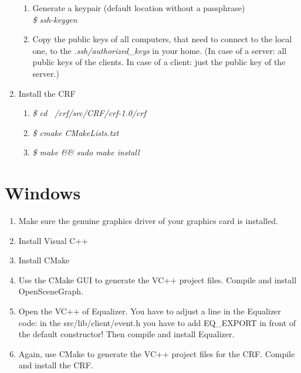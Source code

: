 \begin{enumerate}
		\begin{enumerate}
                        \item Generate a keypair (default location without a passphrase) \\ 
				\textit{\$ ssh-keygen}
                        \item Copy the public keys of all computers, that need to connect to the local one, to the \textit{.ssh/authorized\_keys} in your home. (In case of a server: all public keys of the clients. In case of a client: just the public key of the server.)
                \end{enumerate}
	\item Install the CRF
		\begin{enumerate}
                        \item \textit{\$ cd ~/crf/src/CRF/crf-1.0/crf}
                        \item \textit{\$ cmake CMakeLists.txt}
                        \item \textit{\$ make \&\& sudo make install}
                \end{enumerate}
\end{enumerate}


\section{Windows}

\begin{enumerate}
	\item Make sure the genuine graphics driver of your graphics card is installed.
	\item Install Visual C++ 
	\item Install CMake
	\item Use the CMake GUI to generate the VC++ project files. Compile and install OpenSceneGraph.
	\item Open the VC++ of Equalizer. You have to adjust a line in the Equalizer code: in the src/lib/client/event.h you have to add EQ\_EXPORT in front of the default constructor! Then compile and install Equalizer.
	\item Again, use CMake to generate the VC++ project files for the CRF. Compile and install the CRF.
\end{enumerate}
